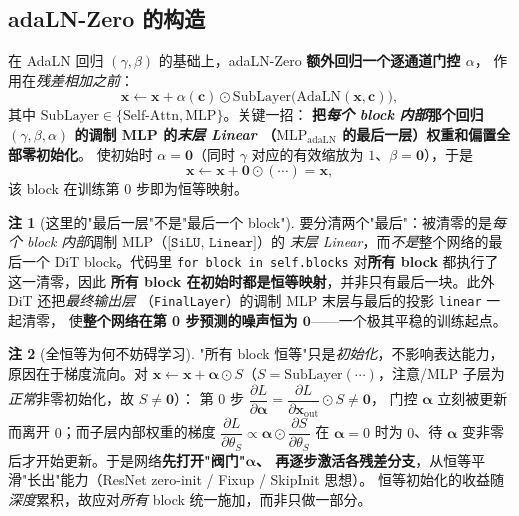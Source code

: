 \documentclass[11pt]{ctexart}
\newcommand{\AdaLN}{\mathrm{AdaLN}}
\newcommand{\cc}{\mathbf{c}}
\newcommand{\xx}{\mathbf{x}}
\theoremstyle{definition}
\newtheorem{remark}{注}[section]
\begin{document}
\subsection{adaLN-Zero 的构造}
在 AdaLN 回归 $(\gamma,\beta)$ 的基础上，adaLN-Zero \textbf{额外回归一个逐通道门控 $\alpha$}，
作用在\emph{残差相加之前}：
\begin{equation}
\xx \leftarrow \xx + \alpha(\cc)\odot \mathrm{SubLayer}\big(\AdaLN(\xx,\cc)\big),
\end{equation}
其中 $\mathrm{SubLayer}\in\{\text{Self-Attn},\text{MLP}\}$。关键一招：
\textbf{把\emph{每个 block 内部}那个回归 $(\gamma,\beta,\alpha)$ 的调制 MLP 的\emph{末层 Linear}
（$\mathrm{MLP}_{\text{adaLN}}$ 的最后一层）权重和偏置全部零初始化}。
使初始时 $\alpha=\bm 0$（同时 $\gamma$ 对应的有效缩放为 $1$、$\beta=\bm 0$），于是
\[
\xx \leftarrow \xx + \bm 0 \odot (\cdots) = \xx,
\]
该 block 在训练第 0 步即为恒等映射。

\begin{remark}[这里的"最后一层"不是"最后一个 block"]
要分清两个"最后"：被清零的是\emph{每个 block 内部}调制 MLP（$\texttt{[SiLU, Linear]}$）的
\emph{末层 Linear}，而\emph{不是}整个网络的最后一个 DiT block。代码里
\texttt{for block in self.blocks} 对\textbf{所有 block} 都执行了这一清零，因此
\textbf{所有 block 在初始时都是恒等映射}，并非只有最后一块。此外 DiT 还把\emph{最终输出层}
（\texttt{FinalLayer}）的调制 MLP 末层与最后的投影 \texttt{linear} 一起清零，
使\textbf{整个网络在第 0 步预测的噪声恒为 $\bm 0$}——一个极其平稳的训练起点。
\end{remark}

\begin{remark}[全恒等为何不妨碍学习]
"所有 block 恒等"只是\emph{初始化}，不影响表达能力，原因在于梯度流向。对
$\xx\leftarrow\xx+\bm\alpha\odot S$（$S=\mathrm{SubLayer}(\cdots)$，注意/MLP 子层为\emph{正常}非零初始化，故 $S\neq\bm 0$）：
第 0 步 $\dfrac{\partial L}{\partial\bm\alpha}=\dfrac{\partial L}{\partial\xx_{\text{out}}}\odot S\neq\bm0$，
门控 $\bm\alpha$ 立刻被更新而离开 $0$；而子层内部权重的梯度
$\dfrac{\partial L}{\partial\theta_S}\propto\bm\alpha\odot\dfrac{\partial S}{\partial\theta_S}$
在 $\bm\alpha=0$ 时为 $0$、待 $\bm\alpha$ 变非零后才开始更新。于是网络\textbf{先打开"阀门"$\bm\alpha$、
再逐步激活各残差分支}，从恒等平滑"长出"能力（ResNet zero-init / Fixup / SkipInit 思想）。
恒等初始化的收益随\emph{深度}累积，故应对\emph{所有} block 统一施加，而非只做一部分。
\end{remark}
\end{document}
